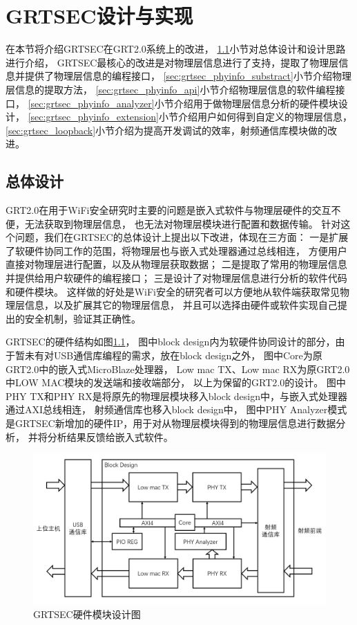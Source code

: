
\chapter{GRTSEC设计与实现}\label{chap:grtsec_design}
	在本节将介绍GRTSEC在GRT2.0系统上的改进，
	\ref{sec:grtsec_overview}小节对总体设计和设计思路进行介绍，
	GRTSEC最核心的改进是对物理层信息进行了支持，提取了物理层信息并提供了物理层信息的编程接口，
	\ref{sec:grtsec_phyinfo_substract}小节介绍物理层信息的提取方法，
	\ref{sec:grtsec_phyinfo_api}小节介绍物理层信息的软件编程接口，
	\ref{sec:grtsec_phyinfo_analyzer}小节介绍用于做物理层信息分析的硬件模块设计，
	\ref{sec:grtsec_phyinfo_extension}小节介绍用户如何得到自定义的物理层信息，
	\ref{sec:grtsec_loopback}小节介绍为提高开发调试的效率，射频通信库模块做的改进。

	\section{总体设计}\label{sec:grtsec_overview}
	GRT2.0在用于WiFi安全研究时主要的问题是嵌入式软件与物理层硬件的交互不便，无法获取到物理层信息，
	也无法对物理层模块进行配置和数据传输。
	针对这个问题，我们在GRTSEC的总体设计上提出以下改进，体现在三方面：
	一是扩展了软硬件协同工作的范围，将物理层也与嵌入式处理器通过总线相连，
	方便用户直接对物理层进行配置，以及从物理层获取数据；
	二是提取了常用的物理层信息并提供给用户软硬件的编程接口；
	三是设计了对物理层信息进行分析的软件代码和硬件模块。
	这样做的好处是WiFi安全的研究者可以方便地从软件端获取常见物理层信息，以及扩展其它的物理层信息，
	并且可以选择由硬件或软件实现自己提出的安全机制，验证其正确性。

	GRTSEC的硬件结构如图\ref{fig:grtsec_hw_design}，
	图中block design内为软硬件协同设计的部分，由于暂未有对USB通信库编程的需求，放在block design之外，
	图中Core为原GRT2.0中的嵌入式MicroBlaze处理器，
	Low mac TX、Low mac RX为原GRT2.0中LOW MAC模块的发送端和接收端部分，
	以上为保留的GRT2.0的设计。
	图中PHY TX和PHY RX是将原先的物理层模块移入block design中，与嵌入式处理器通过AXI总线相连，
	射频通信库也移入block design中，
	图中PHY Analyzer模式是GRTSEC新增加的硬件IP，用于对从物理层模块得到的物理层信息进行数据分析，
	并将分析结果反馈给嵌入式软件。
		\begin{figure}
			\centering
			\includegraphics[width=1.0\textwidth]{img/GRTSEC_hw_design.png}
			\caption{GRTSEC硬件模块设计图}
			\label{fig:grtsec_hw_design}
		\end{figure}


